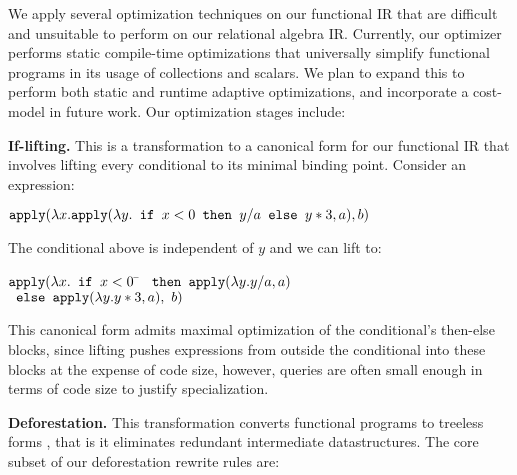We apply several optimization techniques on our functional IR that are difficult
and unsuitable to perform on our relational algebra IR. Currently, our optimizer
performs static compile-time optimizations that universally simplify functional
programs in its usage of collections and scalars. We plan to expand this to
perform both static and runtime adaptive optimizations, and incorporate a
cost-model in future work. Our optimization stages include:


\vspace{1mm}
\noindent\textbf{If-lifting.} This is a transformation to a canonical form
for our functional IR that involves lifting every conditional to its minimal
binding point. Consider an expression:

$\mbox{\texttt{apply}}(\lambda x. \mbox{\texttt{apply}}(\lambda y.
  \mbox{\texttt{ if }} x < 0 \mbox{\texttt{ then }} y/a
                             \mbox{\texttt{ else }} y*3, a), b)$

\vspace{1mm}
\noindent The conditional above is independent of $y$ and we can lift to:

\vspace{-2mm}
\begin{tabbing}
$\mbox{\texttt{apply}}(\lambda x.
  \mbox{\texttt{ if }} x < 0$ \= $\mbox{\texttt{ then }}
    \mbox{\texttt{apply}}(\lambda y. y/a, a)$\\
\> $\mbox{\texttt{ else }} \mbox{\texttt{apply}}(\lambda y. y*3, a),\ b)$
\end{tabbing}


\vspace{-2mm}  
\noindent This canonical form admits maximal optimization of the conditional's
then-else blocks, since lifting pushes expressions from outside the conditional
into these blocks at the expense of code size, however, queries are often
small enough in terms of code size to justify specialization.


\vspace{1mm}
\noindent\textbf{Deforestation.} This transformation converts functional
programs to treeless forms , that is it eliminates
redundant intermediate datastructures. The core subset of our deforestation
rewrite rules are:

\def\xform{\mbox{\texttt{:-}}}
\def\fst{\mbox{\texttt{fst}}}

